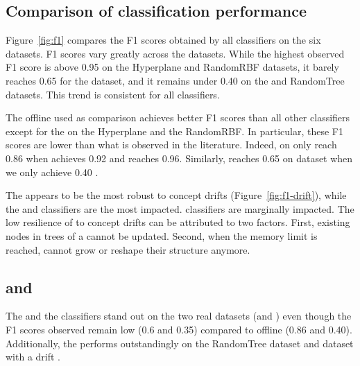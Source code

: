 \subsection{Comparison of classification performance}


Figure~\ref{fig:f1} compares the F1 scores obtained by all classifiers on the
six datasets.
F1 scores vary greatly across the datasets. While the highest
observed F1 score is above 0.95 on the Hyperplane and RandomRBF datasets,
it barely reaches 0.65 for the \banosdataset dataset, and it remains under
0.40 on the \recofitdataset and RandomTree datasets. This trend is
consistent for all classifiers.

The offline \knn used as comparison achieves better F1 scores than all
other classifiers except for the \mondrianforest on the Hyperplane and the
RandomRBF. In particular, these F1 scores are lower than what is observed
in the literature. Indeed, on \banosdataset \knn only reach 0.86 when
\cite{behzad2019} achieves 0.92 and \cite{Banos_2014} reaches 0.96.
Similarly, \cite{behzad2019} reaches 0.65 on \recofitdataset dataset when
we only achieve 0.40 .

The \hoeffdingtree appears to be the most robust to concept drifts
(Figure~\ref{fig:f1-drift}), while the \mondrianforest and \naivebayes
classifiers are the most impacted. \mcnn classifiers are marginally impacted.
The low resilience of \mondrianforest to concept drifts can be attributed to
two factors. First, existing nodes in trees of a \mondrianforest cannot be updated.
Second, when the memory limit is reached, \mondriantrees cannot grow
or reshape their structure anymore.

\subsection{\hoeffdingtree and \naivebayes}

The \naivebayes and the \hoeffdingtree classifiers stand out on the two real datasets
(\banosdataset and \recofitdataset) even though the F1 scores observed remain
low (0.6 and 0.35) compared to offline \knn (0.86 and 0.40). Additionally, the
\hoeffdingtree performs outstandingly on the RandomTree dataset and
\banosdataset dataset with a drift .

